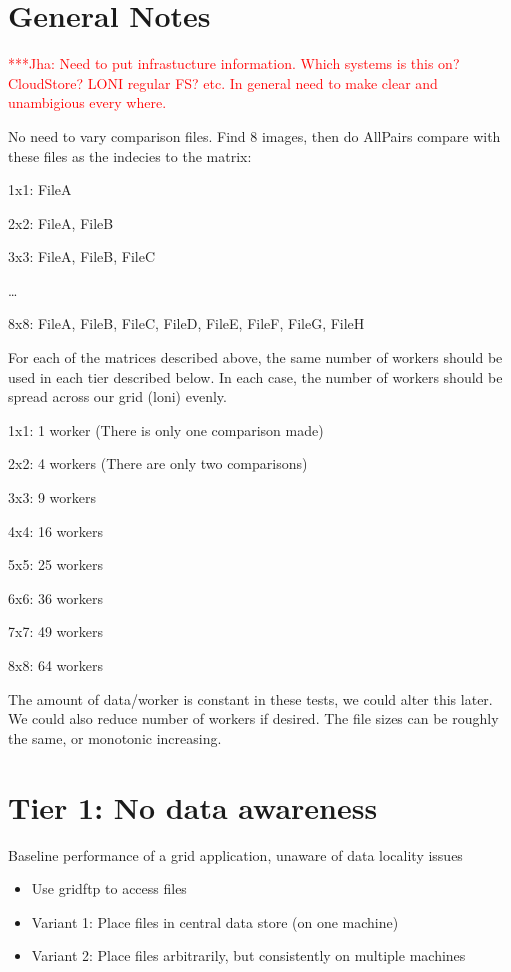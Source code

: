 \documentclass[a4paper,12pt]{article}
\newcommand{\jhanote}[1]{ {\textcolor{red} { ***Jha: #1 }}}
\newcommand{\jhanote}[1]{}
\begin{document}
\section{General Notes}

\jhanote{Need to put infrastucture information. Which systems is this on?  CloudStore? LONI regular FS? etc. In general need to make clear and unambigious every where.}

No need to vary comparison files.  Find 8 images, then do AllPairs compare with these files as the indecies to the matrix:

1x1: FileA

2x2: FileA, FileB

3x3: FileA, FileB, FileC

\ldots

8x8: FileA, FileB, FileC, FileD, FileE, FileF, FileG, FileH

For each of the matrices described above, the same number of workers should be used in each tier described below.  In each case, the number of workers should be spread across our grid (loni) evenly.

1x1: 1 worker (There is only one comparison made)

2x2: 4 workers (There are only two comparisons)

3x3: 9 workers

4x4: 16 workers

5x5: 25 workers

6x6: 36 workers

7x7: 49 workers

8x8: 64 workers

The amount of data/worker is constant in these tests, we could alter this later. We could also reduce number of workers if desired.
The file sizes can be roughly the same, or monotonic increasing.

\section{Tier 1: No data awareness}
Baseline performance of a grid application, unaware of data locality issues
\begin{itemize}
\item Use gridftp to access files
\item Variant 1: Place files in central data store (on one machine)
\item Variant 2: Place files arbitrarily, but consistently on multiple machines
\end{itemize}
\end{document}
